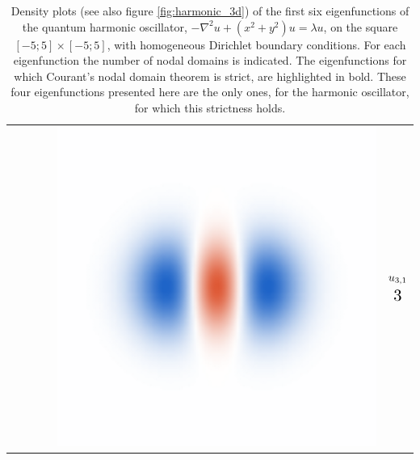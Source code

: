 \begin{table}
\begin{center}
\begin{tabular}{rlrl|rl|}
      \cline{3-6}                                                                                                          &                                                      &                                                                                                                      &                                & \parbox[c]{\hoWidth}{\vspace{2pt}\includegraphics[width=\linewidth]{img/chapter3/counting/harmonic/6c.png}\vspace{2pt}} & $ \begin{matrix} u_{3,1} \vspace{5pt}\\ \scalebox{1.5}{$3$} \end{matrix} $  \\
    \end{tabular}
    \caption{\label{tab:courant_harmonic}Density plots (see also figure \ref{fig:harmonic_3d}) of the first six eigenfunctions of the quantum harmonic oscillator, $-\nabla^2 u + (x^2+y^2) u = \lambda u$, on the square $[-5;5]\times [-5;5]$, with homogeneous Dirichlet boundary conditions. For each eigenfunction the number of nodal domains is indicated. The eigenfunctions for which Courant's nodal domain theorem is strict, are highlighted in bold. These four eigenfunctions presented here are the only ones, for the harmonic oscillator, for which this strictness holds. }
  \end{center}
\end{table}

